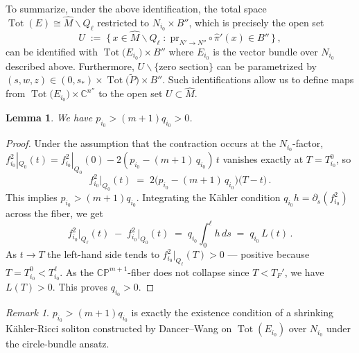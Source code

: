 \documentclass[11pt]{amsart}
\theoremstyle{plain}
\numberwithin{equation}{section}
\newtheorem{lemma}[theorem]{Lemma}
\theoremstyle{definition}
\theoremstyle{remark}
\newtheorem*{remarkx}{Remark}
\begin{document}
To summarize, under the above identification, the total space $\operatorname{Tot}(E) \cong \widehat{M} \backslash Q_\ell$ restricted to $N_{i_0} \times B''$, which is precisely the open set
\begin{equation}
\label{eq:U}
U \;:=\; \Big\{ \, x \in \widehat{M} \backslash Q_\ell \;:\; \mathrm{pr}_{N' \to N''} \circ \widehat{\pi}' (x) \in B'' \, \Big\} \,, 
\end{equation}
can be identified with $\operatorname{Tot}\big(E_{i_0}\big) \times B''$ where $E_{i_0}$ is the vector bundle over $N_{i_0}$ described above. Furthermore, $U \backslash \{\text{zero section}\}$ can be parametrized by $(s,w,z) \in (0,s_*) \times \operatorname{Tot}\big(\widetilde{P}\big) \times B''$. Such identifications allow us to define maps from $\operatorname{Tot}\big(E_{i_0}\big) \times \mathbb{C}^{n''}$ to the open set $U \subset \widehat{M}$.


\begin{lemma}
\label{lma:contraction_Q0_signs}
We have $p_{i_0} > (m+1)q_{i_0} > 0$.
\end{lemma}

\begin{proof}
Under the assumption that the contraction occurs at the $N_{i_0}$-factor, $f_{i_0}^2 |_{Q_0} (t) = f_{i_0}^2 |_{Q_0} (0) - 2 (p_{i_0} - ( m + 1 ) \, q_{i_0} ) \, t$ vanishes exactly at $T = T_{i_0}^0$, so
\begin{equation*}
f_{i_0}^2 \big|_{Q_0} (t) \;=\; 2 \big( p_{i_0} - ( m + 1 ) \, q_{i_0} \big) \big( T - t \big) \,.
\end{equation*}
This implies $p_{i_0} > ( m + 1 )q_{i_0}$.
Integrating the K\"ahler condition $q_{i_0}h = \partial_s(f_{i_0}^2)$ across the fiber, we get
\begin{equation*}
f_{i_0}^2 \big|_{Q_\ell} (t) \;-\; f_{i_0}^2 \big|_{Q_0} (t) \;=\; q_{i_0} \int_0^{\ell} h \,ds\;=\; q_{i_0} \, L (t) \,.
\end{equation*}
As $t \to T$ the left-hand side tends to $f_{i_0}^2 |_{Q_\ell} (T) > 0$ --- positive because $T = T_{i_0}^0 < T_{i_0}^{\ell}$. As the $\mathbb{CP}^{m+1}$-fiber does not collapse since $T < T_F'$, we have $L (T) > 0$. This proves $q_{i_0} > 0$.
\end{proof}

\begin{remarkx}
$p_{i_0} > (m+1)q_{i_0}$ is exactly the existence condition of a shrinking K\"ahler-Ricci soliton constructed by Dancer--Wang \cite{DW2011} on $\operatorname{Tot} ( E_{i_0} )$ over $N_{i_0}$ under the circle-bundle ansatz. 
\end{remarkx}
\end{document}
